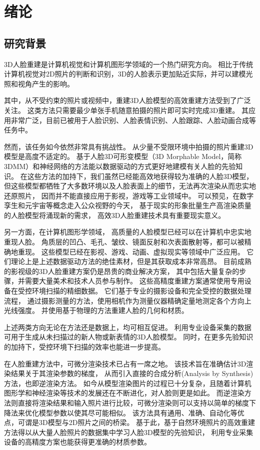 \chapter{绪论}
\label{chap:intro}

\section{研究背景}

3D人脸重建是计算机视觉和计算机图形学领域的一个热门研究方向。
相比于传统计算机视觉对2D照片的判断和识别，3D的人脸表示更加贴近实际，并可以建模光照和视角产生的影响。

其中，从不受约束的照片或视频中，重建3D人脸模型的高效重建方法受到了广泛关注。
这类方法只需要最少单张手机随意拍摄的照片即可实时完成3D重建。
其应用非常广泛，目前已被用于人脸识别\citep{BlanzV03}、人脸表情识别、人脸跟踪、人脸动画合成等任务中。

然而，该任务如今依然非常具有挑战性。
从少量不受限环境中拍摄的照片重建3D模型是高度不适定的。
基于人脸3D可形变模型（3D Morphable Model，简称3DMM）和神经网络的方法能以数据驱动的方式更好地建模有关人脸的先验知识。
在这些方法的加持下，我们虽然已经能高效地获得较为准确的人脸3D模型，
但这些模型都牺牲了大多数环境以及人脸表面上的细节，无法再次渲染从而忠实地还原照片，
因而并不能直接应用于影视，游戏等工业领域中。
可以预见，在数字孪生和元宇宙等概念走入公众视野的今天，
基于现实的形象批量生产高渲染质量的人脸模型将涌现新的需求，
高效3D人脸重建技术具有重要现实意义。

另一方面，在计算机图形学领域，
高质量的人脸模型已经可以在计算机中忠实地重现人脸。
角质层的凹凸、毛孔、皱纹、镜面反射和次表面散射等，都可以被精确地重现。
这些模型已经在影视、游戏、动画、虚拟现实等领域中广泛应用。
它们理论上是上述数据驱动方法的绝佳素材，但是其获取成本非常高昂。
目前成熟的影视级的3D人脸重建方案仍是昂贵的商业解决方案，
其中包括大量复杂的步骤，并需要大量美术和技术人员参与制作。
这些高精度重建方案通常使用专用设备在受控环境扫描的精细数据。
它们基于专业的摄影设备和完全受控的数据处理流程，
通过摄影测量的方法，使用相机作为测量仪器精确定量地测定各个方向上光线强度。
并使用基于物理的方法重建人脸的几何和材质。

上述两类方向无论在方法还是数据上，均可相互促进。
利用专业设备采集的数据可用于生成从未扫描过的新人物或新表情的3D人脸模型。
同时，在更多先验知识的加持下，受控环境下扫描的效率也能进一步提高。

在人脸重建方法中，可微分渲染技术已占有一席之地。
该技术旨在准确估计3D渲染结果关于其渲染参数的梯度，
从而引入直接的合成分析(Analysis by Synthesis)方法，也即逆渲染方法。
如今从模型渲染图片的过程已十分复杂，且随着计算机图形学和神经渲染等技术的发展还在不断进化，对人脸则更是如此。
而逆渲染方法则直接将渲染结果和输入照片进行比较，可微分渲染则可以支持以简单的梯度下降法来优化模型参数以使其尽可能相似。
该方法具有通用、准确、自动化等优点，可谓是3D模型与2D照片之间的桥梁。
基于此，基于自然环境照片的高效重建方法得以从大量人脸照片的数据集中学习人脸3D模型的先验知识，
利用专业采集设备的高精度方案也能获得更准确的材质参数。

